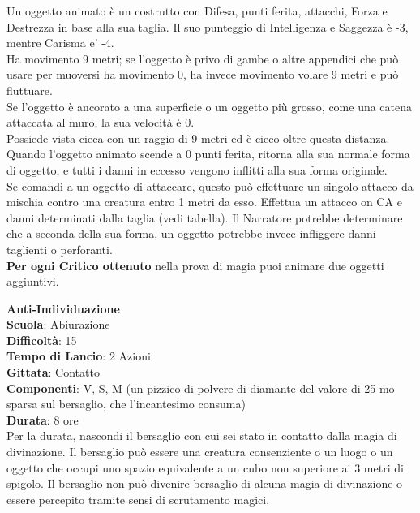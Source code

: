 \bigskip

\begin{multicols}{2}

Un oggetto animato è un costrutto con Difesa, punti ferita, attacchi, Forza e Destrezza in base alla sua taglia. Il suo punteggio di Intelligenza e Saggezza è -3, mentre Carisma e' -4.\\
Ha movimento 9 metri; se l'oggetto è privo di gambe o altre appendici che può usare per muoversi ha movimento 0, ha invece movimento volare 9 metri e può fluttuare. 
\\Se l'oggetto è ancorato a una superficie o un oggetto più grosso, come una catena attaccata al muro, la sua velocità è 0.\\
Possiede vista cieca con un raggio di 9 metri ed è cieco oltre questa distanza.\\
Quando l'oggetto animato scende a 0 punti ferita, ritorna alla sua normale forma di oggetto, e tutti i danni in eccesso vengono inflitti alla sua forma originale.\\
Se comandi a un oggetto di attaccare, questo può effettuare un singolo attacco da mischia contro una creatura entro 1 metri da esso. Effettua un attacco on CA e danni determinati dalla taglia (vedi tabella). Il Narratore potrebbe determinare che a seconda della sua forma, un oggetto potrebbe invece infliggere danni taglienti o perforanti.\\
\textbf{Per ogni Critico ottenuto} nella prova di magia puoi animare due oggetti aggiuntivi.

\medskip\textbf{Anti-Individuazione}\\
\textbf{Scuola}: Abiurazione\\
\textbf{Difficoltà}: 15\\
\textbf{Tempo di Lancio}: 2 Azioni\\
\textbf{Gittata}: Contatto\\
\textbf{Componenti}: V, S, M (un pizzico di polvere di diamante del valore di 25 mo sparsa sul bersaglio, che l'incantesimo consuma)\\
\textbf{Durata}: 8 ore\\
Per la durata, nascondi il bersaglio con cui sei stato in contatto dalla magia di divinazione. Il bersaglio può essere una creatura consenziente o un luogo o un oggetto che occupi uno spazio equivalente a un cubo non superiore ai 3 metri di spigolo. Il bersaglio non può divenire bersaglio di alcuna magia di divinazione o essere percepito tramite sensi di scrutamento magici.


\end{multicols}
